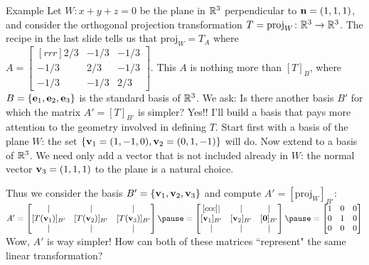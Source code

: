 \begin{frame}{Example}
Let $W\colon x+y+z=0$ be the plane in ${\mathbb R}^3$ perpendicular to ${\mathbf n}=(1,1,1)$, and consider the orthogonal projection transformation $T=\text{proj}_W\colon {\mathbb R}^3\rightarrow {\mathbb R}^3$. 
\bpause
The recipe in the last slide tells us that $\text{proj}_W=T_A$ where $A=\begin{bmatrix}[rrr]2/3 &-1/3&-1/3\\-1/3&2/3&-1/3\\ -1/3&-1/3&2/3
\end{bmatrix}
$. 
\bpause
This $A$ is nothing more than $[T]_B$, where $B=\{{\mathbf e}_1,{\mathbf e}_2,{\mathbf e}_3\}$ is the \alert{standard basis} of ${\mathbb R}^3$. We ask: Is there another basis $B'$ for which the matrix $A'=[T]_{B'}$ is simpler? 
\bpause
Yes!! I'll build a basis that pays more attention to the geometry involved in defining $T$. Start first with a basis of the plane $W$: the set $\{{\mathbf v}_1=(1,-1,0),{\mathbf v}_2=(0,1,-1)\}$ will do. Now \alert{extend} to a basis of ${\mathbb R}^3$. We need only add a vector that is not included already in $W$: the normal vector ${\mathbf v}_3=(1,1,1)$ to the plane is a natural choice. 

\pause Thus we consider the basis $B'=\{{\mathbf v}_1,{\mathbf v}_2, {\mathbf v}_3\}$ and compute $A'=[\text{proj}_W]_{B'}$:
{\scriptsize
$
A'=\begin{bmatrix}
\vert&\vert&\vert\\
[T(\boldv_1)]_{B'}&[T(\boldv_2)]_{B'}&[T(\boldv_3)]_{B'}\\
\vert&\vert&\vert
\end{bmatrix}
\pause=
\begin{bmatrix}[ccc]
\vert&\vert&\vert\\
[\boldv_1]_{B'}&[\boldv_2]_{B'}&[\boldzero]_{B'}\\
\vert&\vert&\vert
\end{bmatrix}
\pause =\begin{bmatrix}
1&0&0\\
0&1&0\\
0&0&0
\end{bmatrix}
$
}
\bpause Wow, $A'$ is way simpler! How can both of these matrices ``represent" the same linear transformation?
\end{frame}
